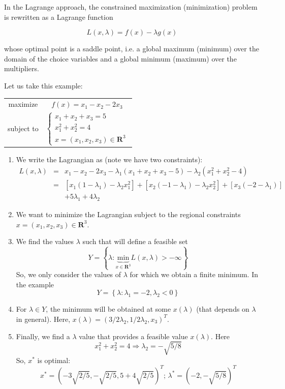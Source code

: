 
  In the Lagrange approach, the constrained maximization (minimization) problem is rewritten as a Lagrange function 
  
  \[L(x,\lambda)=f(x)-\lambda g(x)\]
  
  whose optimal point is a saddle point, i.e. a global maximum (minimum) over the domain of the choice variables and a global minimum (maximum) over the multipliers.

  Let us take this example:
  \begin{center}
  \begin{tabular}{cc}
    maximize & $f(x)=x_1-x_2-2x_3$ \\
    subject to & $\begin{cases}x_1+x_2+x_3=5\\x_1^2+x_2^2=4\\x=(x_1,x_2,x_3)\in \mathbf{R}^3\end{cases}$
  \end{tabular}
\end{center}
\begin{enumerate}
  \item We write the Lagrangian as (note we have two constraints):
  \begin{eqnarray*}
    L(x,\lambda)&=&x_1-x_2-2x_3-\lambda_1 (x_1+x_2+x_3-5)-\lambda_2(x_1^2+x_2^2-4)\\
    &=& [x_1(1-\lambda_1)-\lambda_2x_1^2]+[x_2(-1-\lambda_1)-\lambda_2x_2^2]+[x_3(-2-\lambda_1)]\\
    &&+5\lambda_1+4\lambda_2
  \end{eqnarray*}
  \item We want to minimize the Lagrangian subject to the regional constraints $x=(x_1,x_2,x_3)\in \mathbf{R}^3$.
  \item We find the values $\lambda$ such that will define a feasible set
  \[
  Y=\left\{\lambda: \underbrace{\mathrm{min}}_{x\in  \mathbf{R}^3} L(x,\lambda) >-\infty \right\}
  \]
  So, we only consider the values of $\lambda$ for which we obtain a finite minimum. In the example
  \[
  Y=\left\{\lambda: \lambda_1=-2, \lambda_2<0 \right\}
  \]
  \item For $\lambda \in Y$, the minimum will be obtained at some $x(\lambda)$ (that depends on $\lambda$ in general). Here, $x(\lambda)=(3/2\lambda_2,1/2\lambda_2,x_3)^T$.
  \item Finally, we find a $\lambda$ value that provides a feasible value $x(\lambda)$. Here
  \[
    x_1^2+x_2^2=4 \Rightarrow \lambda_2 = -\sqrt{5/8}
  \]
  So, $x^*$ is optimal:
  \[
    x^* =(-3\sqrt{2/5},-\sqrt{2/5},5+4\sqrt{2/5})^T; \, \lambda^*=(-2,-\sqrt{5/8})^T
  \]
\end{enumerate}


